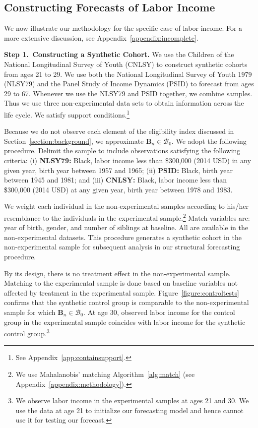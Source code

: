 \subsection{Constructing Forecasts of Labor Income}

We now illustrate our methodology for the specific case of labor income. For a more extensive discussion, see Appendix~\ref{appendix:incomplete}.

\textbf{Step 1.\ Constructing a Synthetic Cohort.} We use the Children of the National Longitudinal Survey of Youth (CNLSY) to construct synthetic cohorts from ages 21 to 29. We use both the National Longitudinal Survey of Youth 1979 (NLSY79) and the Panel Study of Income Dynamics (PSID) to forecast from ages 29 to 67. Whenever we use the NLSY79 and PSID together, we combine samples. Thus we use three non-experimental data sets to obtain information across the life cycle. We satisfy support conditions.\footnote{See Appendix~\ref{app:containsupport}.}

Because we do not observe each element of the eligibility index discussed in Section~\ref{section:background}, we approximate $\bm{B}_{n} \in \mathcal{B}_0$. We adopt the following procedure. Delimit the sample to include observations satisfying the following criteria: (i) \textbf{NLSY79:} Black, labor income less than \$300,000 (2014 USD) in any given year, birth year between 1957 and 1965; (ii) \textbf{PSID:} Black, birth year between 1945 and 1981; and (iii) \textbf{CNLSY:} Black, labor income less than \$300,000 (2014 USD) at any given year, birth year between 1978 and 1983.

We weight each individual in the non-experimental samples according to his/her resemblance to the individuals in the experimental sample.\footnote{We use Mahalanobis' matching Algorithm~\ref{alg:match} (see Appendix~\ref{appendix:methodology}).} Match variables are: year of birth, gender, and number of siblings at baseline. All are available in the non-experimental datasets. This procedure generates a synthetic cohort in the non-experimental sample for subsequent analysis in our structural forecasting procedure.

By its design, there is no treatment effect in the non-experimental sample. Matching to the experimental sample is done based on baseline variables not affected by treatment in the experimental sample. Figure~\ref{figure:controltests} confirms that the synthetic control group is comparable to the non-experimental sample for which $\bm{B}_{n} \in \mathcal{B}_0$. At age 30, observed labor income for the control group in the experimental sample coincides with labor income for the synthetic control group.\footnote{We observe labor income in the experimental samples at ages 21 and 30. We use the data at age 21 to initialize our forecasting model and hence cannot use it for testing our forecast.}

